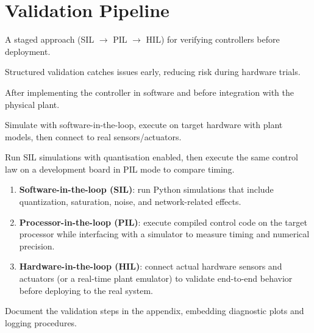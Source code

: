 \section{Validation Pipeline}
\begin{beginnerguide}
    \item[\textbf{What?}] A staged approach (SIL $\rightarrow$ PIL $\rightarrow$ HIL) for verifying controllers before deployment.
    \item[\textbf{Why?}] Structured validation catches issues early, reducing risk during hardware trials.
    \item[\textbf{When?}] After implementing the controller in software and before integration with the physical plant.
    \item[\textbf{How?}] Simulate with software-in-the-loop, execute on target hardware with plant models, then connect to real sensors/actuators.
    \item[\textbf{Example}] Run SIL simulations with quantisation enabled, then execute the same control law on a development board in PIL mode to compare timing.
\end{beginnerguide}
\begin{enumerate}[leftmargin=*]
    \item \textbf{Software-in-the-loop (SIL)}: run Python simulations that include quantization, saturation, noise, and network-related effects.
    \item \textbf{Processor-in-the-loop (PIL)}: execute compiled control code on the target processor while interfacing with a simulator to measure timing and numerical precision.
    \item \textbf{Hardware-in-the-loop (HIL)}: connect actual hardware sensors and actuators (or a real-time plant emulator) to validate end-to-end behavior before deploying to the real system.
\end{enumerate}
Document the validation steps in the appendix, embedding diagnostic plots and logging procedures.

